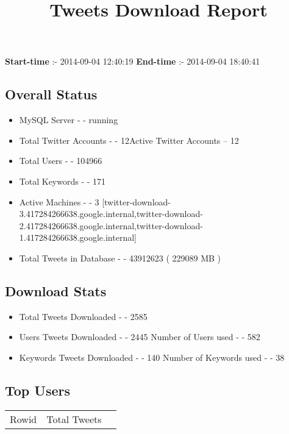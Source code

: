 \documentclass{article}\usepackage[T1]{fontenc}
\begin{document}
\title{\textbf{Tweets Download Report}}
               \date{}
                \maketitle
               \centerline{\textbf{Start-time} :- 2014-09-04 12:40:19 \hspace{40pt} \textbf{End-time} :- 2014-09-04 18:40:41}               \subsection*{Overall Status}                \begin{itemize}                \item MySQL Server - - running               \item Total Twitter Accounts - - 12\newline Active Twitter Accounts -- 12               \item Total Users - - 104966               \item Total Keywords - - 171               \item Active Machines - - 3 [twitter-download-3.417284266638.google.internal,twitter-download-2.417284266638.google.internal,twitter-download-1.417284266638.google.internal]               \item Total Tweets in Database - - 43912623 ( 229089 MB )               \end{itemize}               \subsection*{Download Stats}                \begin{itemize}                \item Total Tweets Downloaded - - 2585               \item Users Tweets Downloaded - - 2445 \newline Number of Users used - - 582               \item Keywords Tweets Downloaded - - 140 \newline Number of Keywords used - - 38              \end{itemize}              \subsection*{Top Users}\begin{tabular}{|c|c|c|}         \hline         Rowid & Total Tweets \\ 

\end{tabular}
\end{document}
